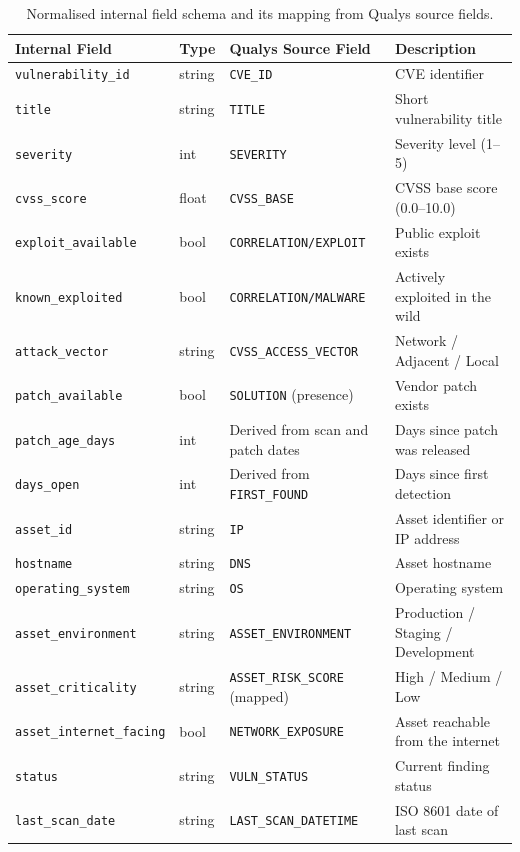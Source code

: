 \begin{table}[h]
\centering
\begin{tabular}{@{}lllp{}@{}}
\toprule
\textbf{Internal Field} & \textbf{Type} & \textbf{Qualys Source Field} & \textbf{Description} \\
\midrule
\texttt{vulnerability\_id}       & string & \texttt{CVE\_ID}                    & CVE identifier \\
\texttt{title}                   & string & \texttt{TITLE}                      & Short vulnerability title \\
\texttt{severity}                & int    & \texttt{SEVERITY}                   & Severity level (1--5) \\
\texttt{cvss\_score}             & float  & \texttt{CVSS\_BASE}                 & CVSS base score (0.0--10.0) \\
\texttt{exploit\_available}      & bool   & \texttt{CORRELATION/EXPLOIT}        & Public exploit exists \\
\texttt{known\_exploited}        & bool   & \texttt{CORRELATION/MALWARE}        & Actively exploited in the wild \\
\texttt{attack\_vector}          & string & \texttt{CVSS\_ACCESS\_VECTOR}       & Network / Adjacent / Local \\
\texttt{patch\_available}        & bool   & \texttt{SOLUTION} (presence)        & Vendor patch exists \\
\texttt{patch\_age\_days}        & int    & Derived from scan and patch dates   & Days since patch was released \\
\texttt{days\_open}              & int    & Derived from \texttt{FIRST\_FOUND}  & Days since first detection \\
\texttt{asset\_id}               & string & \texttt{IP}                         & Asset identifier or IP address \\
\texttt{hostname}                & string & \texttt{DNS}                        & Asset hostname \\
\texttt{operating\_system}       & string & \texttt{OS}                         & Operating system \\
\texttt{asset\_environment}      & string & \texttt{ASSET\_ENVIRONMENT}         & Production / Staging / Development \\
\texttt{asset\_criticality}      & string & \texttt{ASSET\_RISK\_SCORE} (mapped) & High / Medium / Low \\
\texttt{asset\_internet\_facing} & bool   & \texttt{NETWORK\_EXPOSURE}          & Asset reachable from the internet \\
\texttt{status}                  & string & \texttt{VULN\_STATUS}               & Current finding status \\
\texttt{last\_scan\_date}        & string & \texttt{LAST\_SCAN\_DATETIME}       & ISO 8601 date of last scan \\
\bottomrule
\end{tabular}
\caption{Normalised internal field schema and its mapping from Qualys source fields.}
\label{tab:field-mapping}
\end{table}


